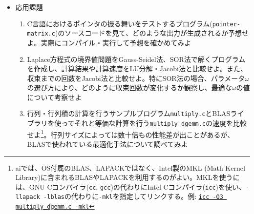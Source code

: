 \documentclass[11pt]{jarticle}
\begin{document}
\begin{itemize}
\item 応用課題
  \begin{enumerate}
  \item C言語におけるポインタの振る舞いをテストするプログラム({\tt pointer-matrix.c})のソースコードを見て、どのような出力が生成されるか予想せよ。実際にコンパイル・実行して予想を確かめてみよ
  \item Laplace方程式の境界値問題をGauss-Seidel法、SOR法で解くプログラムを作成し、計算結果や計算速度をLU分解・Jacobi法と比較せよ。また、収束までの回数をJacobi法と比較せよ。特にSOR法の場合、パラメータ$\omega$の選び方により、どのように収束回数が変化するか観察し、最適な$\omega$の値について考察せよ
  \item 行列・行列積の計算を行うサンプルプログラム{\tt multiply.c}とBLASライブラリを使ってそれと等価な計算を行う{\tt multiply\_dgemm.c}の速度を比較せよ\footnote{aiでは、OS付属のBLAS、LAPACKではなく、Intel製のMKL (Math Kernel Library)に含まれるBLASやLAPACKを利用するのがよい。MKLを使うには、GNU Cコンパイラ({\tt cc}, {\tt gcc})の代わりにIntel Cコンパイラ({\tt icc})を使い、{\tt -llapack -lblas}の代わりに{\tt -mkl}を指定してリンクする。例: \underline{\tt icc -O3 multiply\_dgemm.c -mkl}}。行列サイズによっては数十倍もの性能差が出ことがあるが、BLASで使われている最適化手法について調べてみよ
  \end{enumerate}  
\end{itemize}
\end{document}
